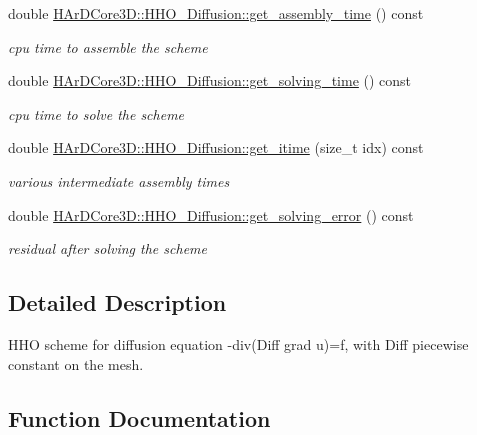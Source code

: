 \begin{DoxyCompactItemize}
double \hyperlink{group__HHO__Diffusion_gaa2bb4d069026f1604d2899031d3642f1}{H\+Ar\+D\+Core3\+D\+::\+H\+H\+O\+\_\+\+Diffusion\+::get\+\_\+assembly\+\_\+time} () const
\begin{DoxyCompactList}\small\item\em cpu time to assemble the scheme \end{DoxyCompactList}\item 
\mbox{\label{group__HHO__Diffusion_gadcad4a2ddc4f767a5cc59362c93adbc2}} 
double \hyperlink{group__HHO__Diffusion_gadcad4a2ddc4f767a5cc59362c93adbc2}{H\+Ar\+D\+Core3\+D\+::\+H\+H\+O\+\_\+\+Diffusion\+::get\+\_\+solving\+\_\+time} () const
\begin{DoxyCompactList}\small\item\em cpu time to solve the scheme \end{DoxyCompactList}\item 
\mbox{\label{group__HHO__Diffusion_ga00b3b186fb915242a805c7c53e323e6e}} 
double \hyperlink{group__HHO__Diffusion_ga00b3b186fb915242a805c7c53e323e6e}{H\+Ar\+D\+Core3\+D\+::\+H\+H\+O\+\_\+\+Diffusion\+::get\+\_\+itime} (size\+\_\+t idx) const
\begin{DoxyCompactList}\small\item\em various intermediate assembly times \end{DoxyCompactList}\item 
\mbox{\label{group__HHO__Diffusion_ga91b1ec7d73685c4a1d49d671b4b69814}} 
double \hyperlink{group__HHO__Diffusion_ga91b1ec7d73685c4a1d49d671b4b69814}{H\+Ar\+D\+Core3\+D\+::\+H\+H\+O\+\_\+\+Diffusion\+::get\+\_\+solving\+\_\+error} () const
\begin{DoxyCompactList}\small\item\em residual after solving the scheme \end{DoxyCompactList}\end{DoxyCompactItemize}


\subsection{Detailed Description}
H\+HO scheme for diffusion equation -\/div(Diff grad u)=f, with Diff piecewise constant on the mesh. 



\subsection{Function Documentation}
\mbox{\label{group__HHO__Diffusion_gab9aebbde87e22073a94a57e26f58a860}} 
